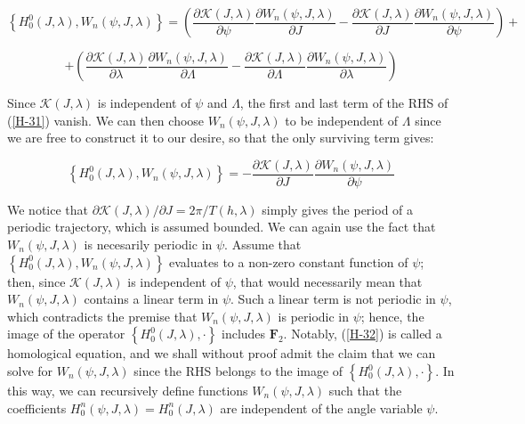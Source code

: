 \begin{equation*}
    \left\{H^0_0(J,\lambda),W_n(\psi, J,\lambda)\right\}=\left(\frac{\partial \mathcal{K}(J,\lambda)}{\partial \psi}\frac{\partial W_n(\psi, J,\lambda)}{\partial J}-\frac{\partial \mathcal{K}(J,\lambda)}{\partial {J}}\frac{\partial W_n(\psi, J,\lambda)}{\partial \psi}\right)+
\end{equation*}

\begin{equation}
    \label{H-31}
    +\left(\frac{\partial \mathcal{K}(J,\lambda)}{\partial \lambda}\frac{\partial W_n(\psi, J, \lambda)}{\partial \Lambda}-\frac{\partial \mathcal{K}(J,\lambda)}{\partial \Lambda}\frac{\partial W_n(\psi, J,\lambda)}{\partial \lambda}\right)
\end{equation}

Since $\mathcal{K}(J,\lambda)$ is independent of $\psi$ and $\Lambda$, the first and last term of the RHS of (\ref{H-31}) vanish. We can then choose $W_n(\psi, J,\lambda)$ to be independent of $\Lambda$ since we are free to construct it to our desire, so that the only surviving term gives:

\begin{equation}
    \label{H-32}
    \left\{H^0_0(J,\lambda),W_n(\psi,J,\lambda)\right\}=-\frac{\partial \mathcal{K}(J,\lambda)}{\partial J}\frac{\partial W_n(\psi, J,\lambda)}{\partial \psi}
\end{equation}

We notice that $\partial\mathcal{K}(J,\lambda)/\partial J=2\pi / T(h,\lambda)$ simply gives the period of a periodic trajectory, which is assumed bounded. We can again use the fact that $W_n(\psi,J,\lambda)$ is necesarily periodic in $\psi$. Assume that $\left\{H^0_0(J,\lambda),W_n(\psi,J,\lambda)\right\}$ evaluates to a non-zero constant function of $\psi$; then, since $\mathcal{K}(J,\lambda)$ is independent of $\psi$, that would necessarily mean that $W_n(\psi, J,\lambda)$ contains a linear term in $\psi$. Such a linear term is not periodic in $\psi$, which contradicts the premise that $W_n(\psi, J,\lambda)$ is periodic in $\psi$; hence, the image of the operator $\left\{H_0^0(J,\lambda),\cdot\right\}$ includes $\mathbf{F}_2$. Notably, (\ref{H-32}) is called a homological equation, and we shall without proof admit the claim that we can solve for $W_n(\psi, J,\lambda)$ since the RHS belongs to the image of $\left\{H^0_0(J,\lambda),\cdot\right\}$. In this way, we can recursively define functions $W_n(\psi, J,\lambda)$ such that the coefficients $H^n_0(\psi, J,\lambda)=H^n_0(J,\lambda)$ are independent of the angle variable $\psi$.

